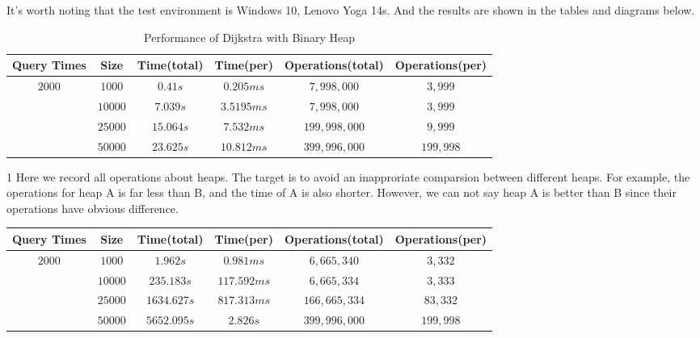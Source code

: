 \documentclass[twoside]{article}
\begin{document}
\begin{CJK*}{UTF8}{gbsn}
It's worth noting that the test environment is Windows 10, Lenovo Yoga 14s.  And the results are shown in the tables and diagrams below. 
\begin{table}[H]
        \centering
        \begin{threeparttable}
    \begin{tabular}{|c|c|c|c|c|c|}
        \hline
        Query Times & Size & Time(total) & Time(per) & Operations(total)\tnote{1} & Operations(per)  \\
        \hline
        \multirow{3}{*}{$2000$}& $1000$ & $0.41s$ & $0.205ms$ & $7,998,000$ & $3,999$ \\
        \cline{2-6}
        & $10000$ & $7.039s$ & $3.5195ms$ & $7,998,000$ & $3,999$ \\
        \cline{2-6}
        & $25000$ & $15.064s$ & $7.532ms$ & $199,998,000$ & $9,999$\\
        \cline{2-6}
        & $50000$ & $23.625s$ & $10.812ms$ & $399,996,000$ & $199,998$\\
        \hline
    \end{tabular}
    \begin{tablenotes}
        \footnotesize  
        \item[1] Here we record all operations about heaps. The target is to avoid an inapproriate comparsion between different heaps. For example, the operations for heap A is far less than B, and the time of A is also shorter. However, we can not say heap A is better than B since their operations have obvious difference.
    \end{tablenotes}
\end{threeparttable}
    \caption{Performance of Dijkstra with Binary Heap}
\end{table}
\begin{table}[H]
        \centering
    \begin{tabular}{|c|c|c|c|c|c|}
        \hline
        Query Times & Size & Time(total) & Time(per) & Operations(total) & Operations(per)  \\
        \hline
        \multirow{3}{*}{$2000$}& $1000$ & $1.962s$ & $0.981ms$ & $6,665,340$ & $3,332$ \\
        \cline{2-6}
        & $10000$ & $235.183s$ & $117.592ms$ & $6,665,334$ & $3,333$ \\
        \cline{2-6}
        & $25000$ & $1634.627s$ & $817.313ms$ & $166,665,334$ & $83,332$\\
        \cline{2-6}
        & $50000$ & $5652.095s$ & $2.826s$ & $399,996,000$ & $199,998$\\

\end{tabular}
\end{table}
\end{CJK*}
\end{document}
